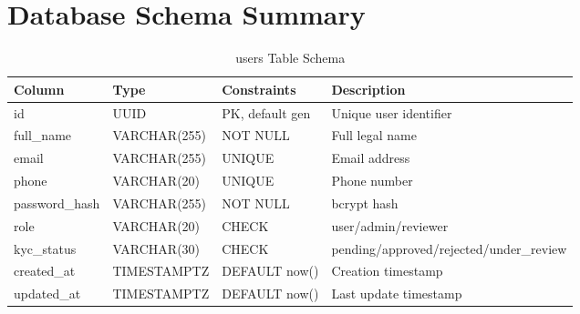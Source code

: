 \chapter{Database Schema Summary}

\begin{table}[H]
\centering
\caption{users Table Schema}
\begin{tabular}{@{}llll@{}}
\toprule
\textbf{Column} & \textbf{Type} & \textbf{Constraints} & \textbf{Description} \\
\midrule
id & UUID & PK, default gen & Unique user identifier \\
full\_name & VARCHAR(255) & NOT NULL & Full legal name \\
email & VARCHAR(255) & UNIQUE & Email address \\
phone & VARCHAR(20) & UNIQUE & Phone number \\
password\_hash & VARCHAR(255) & NOT NULL & bcrypt hash \\
role & VARCHAR(20) & CHECK & user/admin/reviewer \\
kyc\_status & VARCHAR(30) & CHECK & pending/approved/rejected/under\_review \\
created\_at & TIMESTAMPTZ & DEFAULT now() & Creation timestamp \\
updated\_at & TIMESTAMPTZ & DEFAULT now() & Last update timestamp \\
\bottomrule
\end{tabular}
\end{table}


